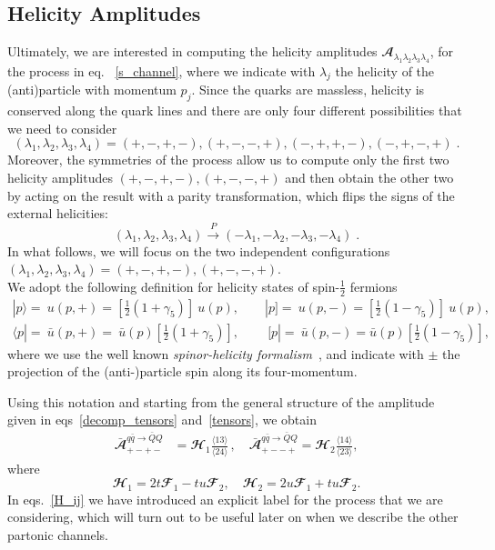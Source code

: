 \subsection{Helicity Amplitudes} 
Ultimately, we are interested in computing the helicity amplitudes 
$\mathbfcal{A}_{\lambda_1 \lambda_2 \lambda_3 \lambda_4}$, 
for the process in eq.~  \eqref{s_channel},
where we indicate with $\lambda_j$ the helicity of the (anti)particle with momentum $p_j$.
Since the quarks are massless, helicity is conserved along the quark lines and there are only four different
possibilities that we need to consider
\begin{equation}
(\lambda_1,\lambda_2,\lambda_3,\lambda_4) = (+,-,+,-),(+,-,-,+),(-,+,+,-),(-,+,-,+) \; .  
\end{equation}
Moreover, the symmetries of the process allow us to compute only the first two helicity amplitudes $(+,-,+,-),(+,-,-,+)$ and then obtain the other two by acting on the result with a parity transformation, which flips the signs of the external helicities: 
\begin{equation}
(\lambda_1,\lambda_2,\lambda_3,\lambda_4)  \xrightarrow{P} (-\lambda_1,-\lambda_2,-\lambda_3,-\lambda_4) \; .
\end{equation}
In what follows, we will focus on the two independent configurations
$(\lambda_1,\lambda_2,\lambda_3,\lambda_4) = (+,-,+,-),(+,-,-,+)$.\\
We adopt the following definition for helicity states of spin-$\frac{1}{2}$ fermions
\begin{align}
  |p \rangle = {\ u} (p,+) = \left[ \frac{1}{2} (1 + \gamma_5) \right] \: {u}(p),  \quad \quad   |p] = {\ u} (p,-) = \left[\frac{1}{2} (1 - \gamma_5) \right] \: {u}(p),  \\[10pt]
   \langle p| = {\ \bar u} (p,+) = {\ \bar u}(p) \left[\frac{1}{2} (1 + \gamma_5) \right], \:  \quad \quad   [ p | = {\ \bar  u} (p,-) =  {\bar u}(p)\left[ \frac{1}{2} (1 - \gamma_5) \right],
\end{align}
where we use the well known \textit{spinor-helicity formalism}~\cite{Dixon:1996wi}, and indicate with $\pm$ the projection of the (anti-)particle spin along its four-momentum.

Using this notation and starting from the general structure of the amplitude given in eqs~\eqref{decomp_tensors} and~\eqref{tensors},
we obtain 
\begin{align}
\bar{\mathbfcal{A}}_{+-+-}^{\scriptstyle q \bar q\rightarrow \bar Q Q} &=  
\mathbfcal{H}_1 \frac{\langle 13 \rangle}{\langle 24 \rangle} \,, \quad 
\bar{\mathbfcal{A}}_{+--+}^{\scriptstyle q \bar q\rightarrow \bar Q Q} =  
\mathbfcal{H}_2 \frac{\langle 14 \rangle}{\langle 2 3 \rangle}, \label{H_ij}
\end{align}
where 
\begin{equation}\label{H1H2def}
\mathbfcal{H}_1 = 2t \mathbfcal{F}_1  - tu \mathbfcal{F}_2,\quad \mathbfcal{H}_2 = 2u \mathbfcal{F}_1  + tu \mathbfcal{F}_2.
\end{equation}
In eqs.~\eqref{H_ij} we have introduced an explicit label for the 
process that we are considering, which will turn out to be useful later on when
we describe the other partonic channels.

